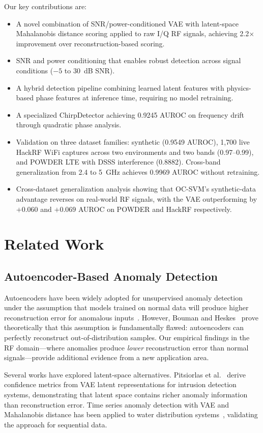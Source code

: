 \documentclass[conference]{IEEEtran}
\begin{document}
Our key contributions are:
\begin{itemize}
\item A novel combination of SNR/power-conditioned VAE with latent-space Mahalanobis distance scoring applied to raw I/Q RF signals, achieving 2.2$\times$ improvement over reconstruction-based scoring.
\item SNR and power conditioning that enables robust detection across signal conditions ($-5$ to $30$~dB SNR).
\item A hybrid detection pipeline combining learned latent features with physics-based phase features at inference time, requiring no model retraining.
\item A specialized ChirpDetector achieving 0.9245 AUROC on frequency drift through quadratic phase analysis.
\item Validation on three dataset families: synthetic (0.9549 AUROC), 1{,}700 live HackRF WiFi captures across two environments and two bands (0.97--0.99), and POWDER LTE with DSSS interference (0.8882). Cross-band generalization from 2.4 to 5~GHz achieves 0.9969 AUROC without retraining.
\item Cross-dataset generalization analysis showing that OC-SVM's synthetic-data advantage reverses on real-world RF signals, with the VAE outperforming by $+0.060$ and $+0.069$ AUROC on POWDER and HackRF respectively.
\end{itemize}

\section{Related Work}
\subsection{Autoencoder-Based Anomaly Detection}
Autoencoders have been widely adopted for unsupervised anomaly detection under the assumption that models trained on normal data will produce higher reconstruction error for anomalous inputs~\cite{kingma2014aevb}. However, Bouman and Heskes~\cite{bouman2025} prove theoretically that this assumption is fundamentally flawed: autoencoders can perfectly reconstruct out-of-distribution samples. Our empirical findings in the RF domain---where anomalies produce \emph{lower} reconstruction error than normal signals---provide additional evidence from a new application area.

Several works have explored latent-space alternatives. Pitsiorlas et al.~\cite{pitsiorlas2024} derive confidence metrics from VAE latent representations for intrusion detection systems, demonstrating that latent space contains richer anomaly information than reconstruction error. Time series anomaly detection with VAE and Mahalanobis distance has been applied to water distribution systems~\cite{springer2020mahalanobis}, validating the approach for sequential data.
\end{document}
